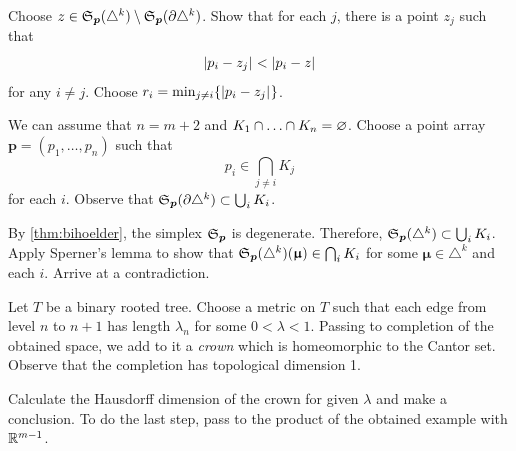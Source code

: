 Choose $z\in \spx{\bm{p}}(\triangle^k)\setminus\spx{\bm{p}}(\partial\triangle^k)$.
Show that for each $j$, there is a point $z_j$ such that
\[\dist{p_i}{z_j}{}<\dist{p_i}{z}{}\]
for any $i\ne j$.
Choose $r_i=\min_{j\ne i}\{\dist{p_i}{z_j}{}\}$.

We can assume that $n=m+2$ and $K_1\cap\ldots\cap K_{n}\z=\emptyset$.
Choose a point array $\bm{p}=(p_1,\dots,p_n)$ such that
\[p_i\in \bigcap_{j\ne i} K_j\]
for each $i$.
Observe that $\spx{\bm{p}}(\partial\triangle^k)\subset \bigcup_iK_i$.

By \ref{thm:bihoelder}, the simplex $\mathfrak{S}_{\bm{p}}$ is degenerate.
Therefore, $\spx{\bm{p}}(\triangle^k)\subset \bigcup_iK_i$.
Apply Sperner's lemma \cite{sperner-lemma} to show that $\spx{\bm{p}}(\triangle^k)(\bm{\mu})\z\in \bigcap_iK_i$ for some $\bm{\mu}\in \triangle^k$ and each $i$.
Arrive at a contradiction.

Let $T$ be a binary rooted tree.
Choose a metric on $T$ such that each edge from level $n$ to $n+1$ has length $\lambda_n$ for some $0<\lambda<1$.
Passing to completion of the obtained space, we add to it a \textit{crown} which is homeomorphic to the Cantor set.
Observe that the completion has topological dimension 1.

Calculate the Hausdorff dimension of the crown for given $\lambda$ and make a conclusion.
To do the last step, pass to the product of the obtained example with $\mathbb{R}^{m-1}$.
